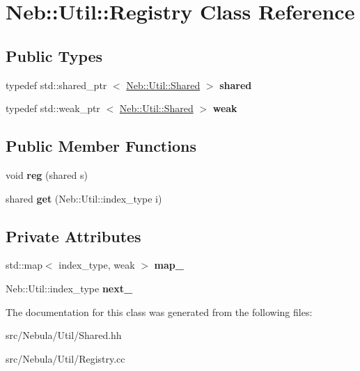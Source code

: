 \hypertarget{classNeb_1_1Util_1_1Registry}{\section{\-Neb\-:\-:\-Util\-:\-:\-Registry \-Class \-Reference}
\label{classNeb_1_1Util_1_1Registry}
}
\subsection*{\-Public \-Types}
\begin{DoxyCompactItemize}
\item 
\hypertarget{classNeb_1_1Util_1_1Registry_a758d64b72b3fe08e95ee5e87e3e8a6e2}{typedef std\-::shared\-\_\-ptr\*
$<$ \hyperlink{classNeb_1_1Util_1_1Shared}{\-Neb\-::\-Util\-::\-Shared} $>$ {\bfseries shared}}\label{classNeb_1_1Util_1_1Registry_a758d64b72b3fe08e95ee5e87e3e8a6e2}

\item 
\hypertarget{classNeb_1_1Util_1_1Registry_a538f475ac1158980006621f4f63fb788}{typedef std\-::weak\-\_\-ptr\*
$<$ \hyperlink{classNeb_1_1Util_1_1Shared}{\-Neb\-::\-Util\-::\-Shared} $>$ {\bfseries weak}}\label{classNeb_1_1Util_1_1Registry_a538f475ac1158980006621f4f63fb788}

\end{DoxyCompactItemize}
\subsection*{\-Public \-Member \-Functions}
\begin{DoxyCompactItemize}
\item 
\hypertarget{classNeb_1_1Util_1_1Registry_a199e1d3a73c1ba5fda739719fe5072df}{void {\bfseries reg} (shared s)}\label{classNeb_1_1Util_1_1Registry_a199e1d3a73c1ba5fda739719fe5072df}

\item 
\hypertarget{classNeb_1_1Util_1_1Registry_ae1431deed69aee68251146fe5d56a1c9}{shared {\bfseries get} (\-Neb\-::\-Util\-::index\-\_\-type i)}\label{classNeb_1_1Util_1_1Registry_ae1431deed69aee68251146fe5d56a1c9}

\end{DoxyCompactItemize}
\subsection*{\-Private \-Attributes}
\begin{DoxyCompactItemize}
\item 
\hypertarget{classNeb_1_1Util_1_1Registry_a237802c005f5551d92b3407a1091d5d2}{std\-::map$<$ index\-\_\-type, weak $>$ {\bfseries map\-\_\-}}\label{classNeb_1_1Util_1_1Registry_a237802c005f5551d92b3407a1091d5d2}

\item 
\hypertarget{classNeb_1_1Util_1_1Registry_ae1e8228823532d4c7f3b7bc8959081c2}{\-Neb\-::\-Util\-::index\-\_\-type {\bfseries next\-\_\-}}\label{classNeb_1_1Util_1_1Registry_ae1e8228823532d4c7f3b7bc8959081c2}

\end{DoxyCompactItemize}


\-The documentation for this class was generated from the following files\-:\begin{DoxyCompactItemize}
\item 
src/\-Nebula/\-Util/\-Shared.\-hh\item 
src/\-Nebula/\-Util/\-Registry.\-cc\end{DoxyCompactItemize}
